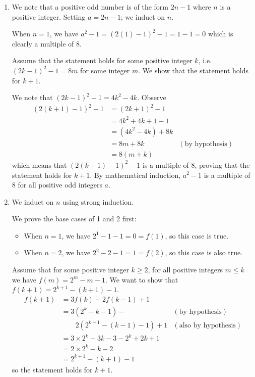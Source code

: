 \begin{enumerate}
    \item We note that a positive odd number is of the form $2n - 1$ where $n$ is a positive integer. Setting $a = 2n - 1$; we induct on $n$.
    
    When $n = 1$, we have $a^2 - 1 = (2(1) - 1)^2 - 1 = 1 - 1 = 0$ which is clearly a multiple of 8.
    
    Assume that the statement holds for some positive integer $k$, i.e. $(2k-1)^2 - 1 = 8m$ for some integer $m$. We show that the statement holds for $k + 1$.
    
    We note that $(2k-1)^2 - 1 = 4k^2 - 4k$. Observe
    \begin{align*}
        (2(k+1)-1)^2 - 1 &= (2k+1)^2 - 1\\
        &= 4k^2 + 4k + 1 - 1\\
        &= (4k^2 - 4k) + 8k\\
        &= 8m + 8k & (\text{by hypothesis})\\
        &= 8(m+k)
    \end{align*}
    which means that $(2(k+1)-1)^2 - 1$ is a multiple of 8, proving that the statement holds for $k+1$. By mathematical induction, $a^2 - 1$ is a multiple of 8 for all positive odd integers $a$.
    
    \item We induct on $n$ using strong induction.
    
    We prove the base cases of 1 and 2 first:
    \begin{itemize}
        \item When $n = 1$, we have $2^1 - 1 - 1 = 0 = f(1)$, so this case is true.
        \item When $n = 2$, we have $2^2 - 2 - 1 = 1 = f(2)$, so this case is also true.
    \end{itemize}
    
    Assume that for some positive integer $k \geq 2$, for all positive integers $m \leq k$ we have $f(m) = 2^m - m - 1$. We want to show that $f(k+1) = 2^{k+1} - (k+1) - 1$.
    \begin{align*}
        f(k+1) &= 3f(k) - 2f(k-1) + 1\\
        &= 3(2^k - k - 1) - & (\text{by hypothesis})\\
        &\quad\quad2(2^{k-1} - (k-1) - 1) + 1 & (\text{also by hypothesis}) \\
        &= 3\times 2^k - 3k - 3 -2^k + 2k + 1\\
        &= 2\times2^k - k - 2\\
        &= 2^{k+1} - (k+1) - 1
    \end{align*}
    so the statement holds for $k+1$.
    

\end{enumerate}
